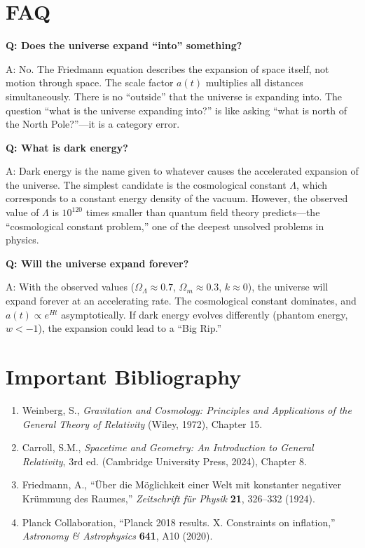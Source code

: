 \section*{FAQ}

\textbf{Q: Does the universe expand ``into'' something?}

A: No. The Friedmann equation describes the expansion of space itself, not motion through space. The scale factor $a(t)$ multiplies all distances simultaneously. There is no ``outside'' that the universe is expanding into. The question ``what is the universe expanding into?'' is like asking ``what is north of the North Pole?''---it is a category error.

\textbf{Q: What is dark energy?}

A: Dark energy is the name given to whatever causes the accelerated expansion of the universe. The simplest candidate is the cosmological constant $\Lambda$, which corresponds to a constant energy density of the vacuum. However, the observed value of $\Lambda$ is $10^{120}$ times smaller than quantum field theory predicts---the ``cosmological constant problem,'' one of the deepest unsolved problems in physics.

\textbf{Q: Will the universe expand forever?}

A: With the observed values ($\Omega_\Lambda \approx 0.7$, $\Omega_m \approx 0.3$, $k \approx 0$), the universe will expand forever at an accelerating rate. The cosmological constant dominates, and $a(t) \propto e^{Ht}$ asymptotically. If dark energy evolves differently (phantom energy, $w < -1$), the expansion could lead to a ``Big Rip.''
\section*{Important Bibliography}

\begin{enumerate}
\item Weinberg, S., \textit{Gravitation and Cosmology: Principles and Applications of the General Theory of Relativity} (Wiley, 1972), Chapter 15.
\item Carroll, S.M., \textit{Spacetime and Geometry: An Introduction to General Relativity}, 3rd ed. (Cambridge University Press, 2024), Chapter 8.
\item Friedmann, A., ``\"Uber die M\"oglichkeit einer Welt mit konstanter negativer Kr\"ummung des Raumes,'' \textit{Zeitschrift f\"ur Physik} \textbf{21}, 326--332 (1924).
\item Planck Collaboration, ``Planck 2018 results. X. Constraints on inflation,'' \textit{Astronomy \& Astrophysics} \textbf{641}, A10 (2020).
\end{enumerate}

